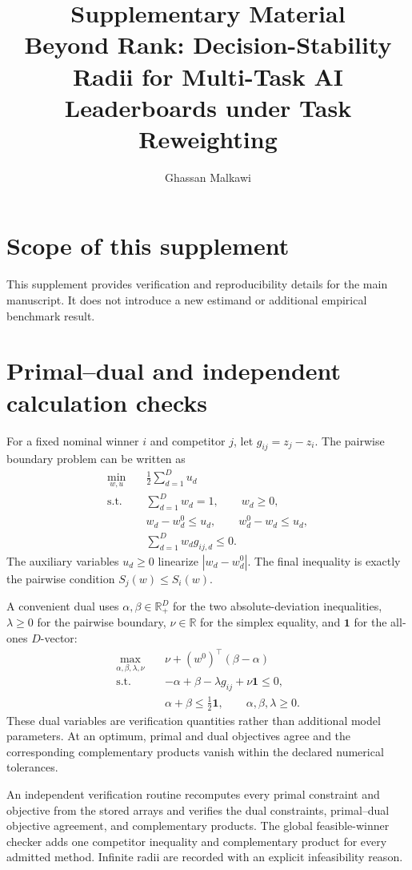 \documentclass[11pt]{article}
\title{Supplementary Material\\Beyond Rank: Decision-Stability Radii for Multi-Task AI Leaderboards under Task Reweighting}
\author{Ghassan Malkawi}
\date{}
\begin{document}
\maketitle

\section*{Scope of this supplement}
This supplement provides verification and reproducibility details for the main manuscript. It does not introduce a new estimand or additional empirical benchmark result.

\section{Primal--dual and independent calculation checks}
For a fixed nominal winner $i$ and competitor $j$, let $g_{ij}=z_j-z_i$. The pairwise boundary problem can be written as
\begin{align}
\min_{w,u}\quad & \frac12\sum_{d=1}^{D}u_d\\
\text{s.t.}\quad & \sum_{d=1}^{D}w_d=1,\qquad w_d\ge0,\\
& w_d-w_d^0\le u_d,\qquad w_d^0-w_d\le u_d,\\
& \sum_{d=1}^{D}w_d g_{ij,d}\le0.
\end{align}
The auxiliary variables $u_d\ge0$ linearize $|w_d-w_d^0|$. The final inequality is exactly the pairwise condition $S_j(w)\le S_i(w)$.

A convenient dual uses $\alpha,\beta\in\mathbb{R}_+^D$ for the two absolute-deviation inequalities, $\lambda\ge0$ for the pairwise boundary, $\nu\in\mathbb{R}$ for the simplex equality, and $\mathbf{1}$ for the all-ones $D$-vector:
\begin{align}
\max_{\alpha,\beta,\lambda,\nu}\quad &
\nu+(w^0)^\top(\beta-\alpha)\\
\text{s.t.}\quad &
-\alpha+\beta-\lambda g_{ij}+\nu\mathbf{1}\le0,\\
& \alpha+\beta\le\frac12\mathbf{1},\qquad
\alpha,\beta,\lambda\ge0.
\end{align}
These dual variables are verification quantities rather than additional model parameters. At an optimum, primal and dual objectives agree and the corresponding complementary products vanish within the declared numerical tolerances.

An independent verification routine recomputes every primal constraint and objective from the stored arrays and verifies the dual constraints, primal--dual objective agreement, and complementary products. The global feasible-winner checker adds one competitor inequality and complementary product for every admitted method. Infinite radii are recorded with an explicit infeasibility reason.
\end{document}
